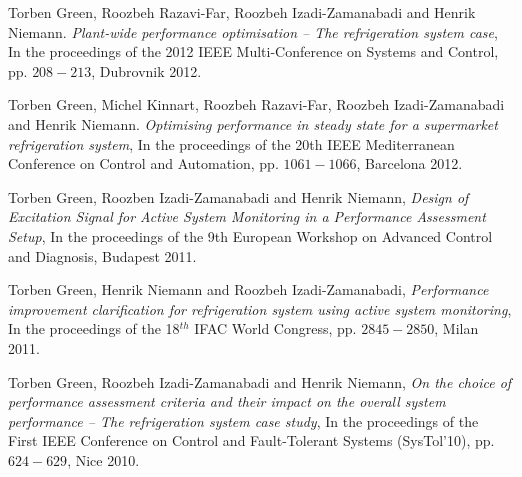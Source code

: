 \documentclass[margin,line,a4paper]{resume}
\begin{document}
\begin{resume}
Torben Green, Roozbeh Razavi-Far, Roozbeh Izadi-Zamanabadi and Henrik Niemann. \textit{Plant-wide performance optimisation -- The refrigeration system case}, In the proceedings of the 2012 IEEE Multi-Conference on Systems and Control, pp. $208-213$, Dubrovnik 2012.

Torben Green, Michel Kinnart, Roozbeh Razavi-Far, Roozbeh Izadi-Zamanabadi and Henrik Niemann. \textit{Optimising performance in steady state for a supermarket refrigeration system}, In the proceedings of the 20th IEEE Mediterranean Conference on Control and Automation, pp. $1061-1066$, Barcelona 2012.

Torben Green, Roozben Izadi-Zamanabadi and Henrik Niemann, \textit{Design of Excitation Signal for Active System Monitoring in a Performance Assessment Setup}, In the proceedings of the 9th European Workshop on Advanced Control and Diagnosis, Budapest 2011.

Torben Green, Henrik Niemann and Roozbeh Izadi-Zamanabadi, \textit{Performance improvement clarification for refrigeration system using active system monitoring}, In the proceedings of the 18$^{th}$ IFAC World Congress, pp. $2845-2850$, Milan 2011. 

Torben Green, Roozbeh Izadi-Zamanabadi and Henrik Niemann, \textit{On the choice of performance assessment criteria and their impact on the overall system performance -- The refrigeration system case study}, In the proceedings of the First IEEE Conference on Control and Fault-Tolerant Systems (SysTol'10), pp. $624-629$, Nice 2010.




\end{resume}
\end{document}
